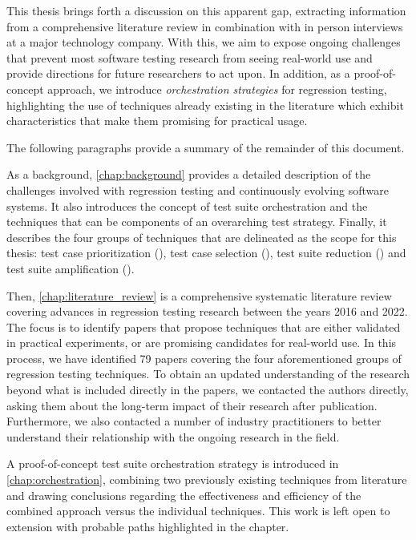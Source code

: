 This thesis brings forth a discussion on this apparent gap, extracting information from a comprehensive literature review in combination with in person interviews at a major technology company.
With this, we aim to expose ongoing challenges that prevent most software testing research from seeing real-world use and provide directions for future researchers to act upon.
In addition, as a proof-of-concept approach, we introduce \textit{orchestration strategies} for regression testing, highlighting the use of techniques already existing in the literature which exhibit characteristics that make them promising for practical usage.

The following paragraphs provide a summary of the remainder of this document.

As a background, \autoref{chap:background} provides a detailed description of the challenges involved with regression testing and continuously evolving software systems.
It also introduces the concept of test suite orchestration and the techniques that can be components of an overarching test strategy.
Finally, it describes the four groups of techniques that are delineated as the scope for this thesis: test case prioritization (\tcp), test case selection (\tcs), test suite reduction (\tsr) and test suite amplification (\tsa).

Then, \autoref{chap:literature_review} is a comprehensive systematic literature review covering advances in regression testing research between the years 2016 and 2022.
The focus is to identify papers that propose techniques that are either validated in practical experiments, or are promising candidates for real-world use.
In this process, we have identified 79 papers covering the four aforementioned groups of regression testing techniques.
To obtain an updated understanding of the research beyond what is included directly in the papers, we contacted the authors directly, asking them about the long-term impact of their research after publication.
Furthermore, we also contacted a number of industry practitioners to better understand their relationship with the ongoing research in the field.

A proof-of-concept test suite orchestration strategy is introduced in \autoref{chap:orchestration}, combining two previously existing techniques from literature and drawing conclusions regarding the effectiveness and efficiency of the combined approach versus the individual techniques.
This work is left open to extension with probable paths highlighted in the chapter.

